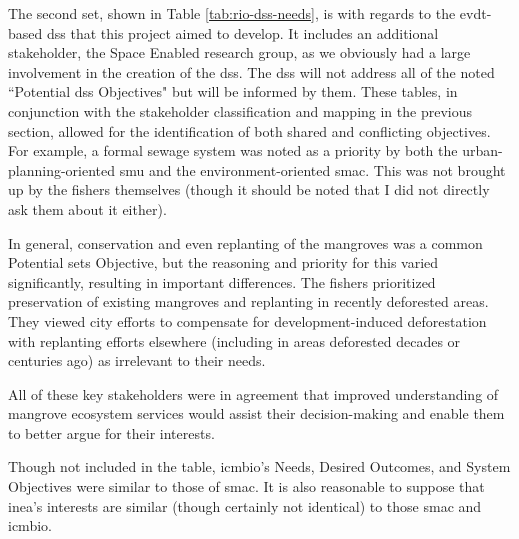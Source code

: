 The second set, shown in Table \ref{tab:rio-dss-needs}, is with regards to the \ac{evdt}-based \ac{dss} that this project aimed to develop. It includes an additional stakeholder, the Space Enabled research group, as we obviously had a large involvement in the creation of the \ac{dss}. The \ac{dss} will not address all of the noted ``Potential \ac{dss} Objectives" but will be informed by them. These tables, in conjunction with the stakeholder classification and mapping in the previous section, allowed for the identification of both shared and conflicting objectives. For example, a formal sewage system was noted as a priority by both the urban-planning-oriented \ac{smu} and the environment-oriented \ac{smac}. This was not brought up by the fishers themselves (though it should be noted that I did not directly ask them about it either).

In general, conservation and even replanting of the mangroves was a common Potential \ac{sets} Objective, but the reasoning and priority for this varied significantly, resulting in important differences. The fishers prioritized preservation of existing mangroves and replanting in recently deforested areas. They viewed city efforts to compensate for development-induced deforestation with replanting efforts elsewhere (including in areas deforested decades or centuries ago) as irrelevant to their needs. 

All of these key stakeholders were in agreement that improved understanding of mangrove ecosystem services would assist their decision-making and enable them to better argue for their interests.  

Though not included in the table, \ac{icmbio}'s Needs, Desired Outcomes, and System Objectives were similar to those of \ac{smac}. It is also reasonable to suppose that \ac{inea}'s interests are similar (though certainly not identical) to those \ac{smac} and \ac{icmbio}.

